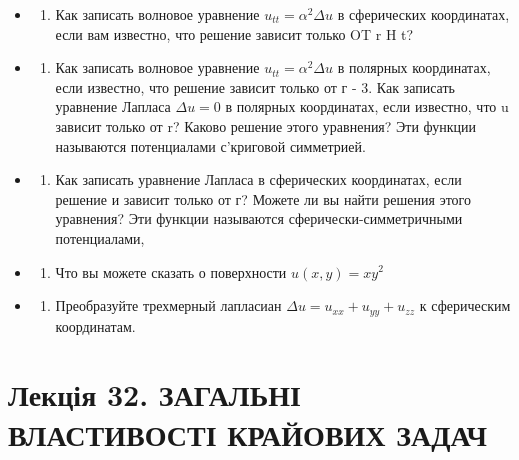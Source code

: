 \documentclass[
  ukrainian,
]{article}
\providecommand{\tightlist}{%
  \setlength{\itemsep}{0pt}\setlength{\parskip}{0pt}}
\begin{document}
\begin{itemize}
\tightlist
\item
  \begin{enumerate}
  \def\labelenumi{\arabic{enumi}.}
  \tightlist
  \item
    Как записать волновое уравнение \(u_{tt} = \alpha^2 \Delta u\) в
    сферических координатах, если вам известно, что решение зависит
    только OT r H t?
  \end{enumerate}
\item
  \begin{enumerate}
  \def\labelenumi{\arabic{enumi}.}
  \setcounter{enumi}{1}
  \tightlist
  \item
    Как записать волновое уравнение \(u_{tt} = \alpha^2 \Delta u\) в
    полярных координатах, если известно, что решение зависит только от г
    - 3. Как записать уравнение Лапласа \(\Delta u = 0\) в полярных
    координатах, если известно, что u зависит только от r? Каково
    решение этого уравнения? Эти функции называются потенциалами
    с'криговой симметрией.
  \end{enumerate}
\item
  \begin{enumerate}
  \def\labelenumi{\arabic{enumi}.}
  \setcounter{enumi}{3}
  \tightlist
  \item
    Как записать уравнение Лапласа в сферических координатах, если
    решение и зависит только от г? Можете ли вы найти решения этого
    уравнения? Эти функции называются сферически-симметричными
    потенциалами,
  \end{enumerate}
\item
  \begin{enumerate}
  \def\labelenumi{\arabic{enumi}.}
  \setcounter{enumi}{4}
  \tightlist
  \item
    Что вы можете сказать о поверхности \(u(x, y) = xy^2\)
  \end{enumerate}
\item
  \begin{enumerate}
  \def\labelenumi{\arabic{enumi}.}
  \setcounter{enumi}{5}
  \tightlist
  \item
    Преобразуйте трехмерный лапласиан
    \(\Delta u = u_{xx} + u_{yy} + u_{zz}\) к сферическим координатам.
  \end{enumerate}
\end{itemize}

\section{Лекція 32. ЗАГАЛЬНІ ВЛАСТИВОСТІ КРАЙОВИХ
ЗАДАЧ}\label{ux43bux435ux43aux446ux456ux44f-32.-ux437ux430ux433ux430ux43bux44cux43dux456-ux432ux43bux430ux441ux442ux438ux432ux43eux441ux442ux456-ux43aux440ux430ux439ux43eux432ux438ux445-ux437ux430ux434ux430ux447}
\end{document}
